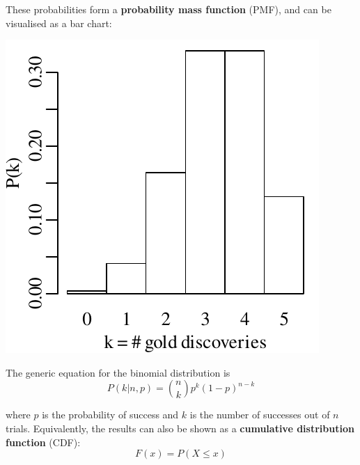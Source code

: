 These probabilities form a \textbf{probability mass function} (PMF),
and can be visualised as a bar chart:

\noindent\begin{minipage}[t][][b]{.3\textwidth}
\includegraphics[width=\textwidth]{../figures/goldbarplot.pdf}
\medskip
\end{minipage}
\begin{minipage}[t][][t]{.7\textwidth}
  \label{fig:goldbar}
\end{minipage}

The generic equation for the binomial distribution is
\begin{equation}
  P(k|n,p) = \binom{n}{k} p^k (1-p)^{n-k}
  \label{eq:binom}
\end{equation}

\noindent where $p$ is the probability of success and $k$ is the
number of successes out of $n$ trials. Equivalently, the results can
also be shown as a \textbf{cumulative distribution function} (CDF):
\begin{equation}
  F(x) = P(X \leq x)
  \label{eq:CDF}
\end{equation}

